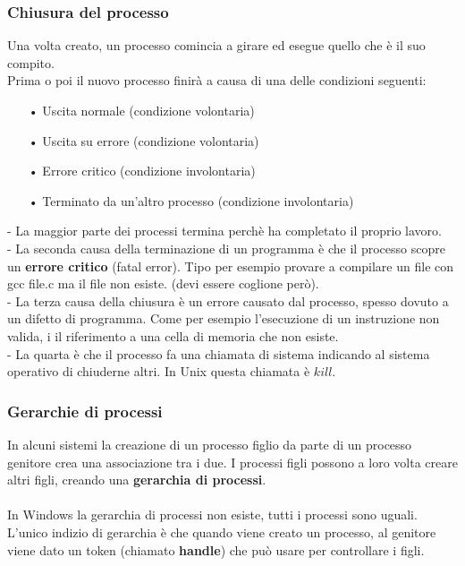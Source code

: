 \documentclass{article}
\begin{document}
\newpage
\subsubsection{Chiusura del processo}
Una volta creato, un processo comincia a girare ed esegue quello che è il suo compito. 
\\Prima o poi il nuovo processo finirà a causa di una delle condizioni seguenti:
\begin{enumerate}
   \item[•] Uscita normale (condizione volontaria)
   \item[•] Uscita su errore (condizione volontaria)
   \item[•] Errore critico (condizione involontaria)
   \item[•] Terminato da un'altro processo (condizione involontaria)
\end{enumerate}
- La maggior parte dei processi termina perchè ha completato il proprio lavoro.
\\
- La seconda causa della terminazione di un programma è che il processo scopre un \textbf{errore critico} (fatal error).
Tipo per esempio provare a compilare un file con gcc file.c ma il file non esiste. (devi essere coglione però).
\\
- La terza causa della chiusura è un errore causato dal processo, spesso dovuto a un difetto di programma. Come per esempio l'esecuzione di un instruzione non valida, i il riferimento a una cella di memoria che non esiste.
\\
- La quarta è che il processo fa una chiamata di sistema indicando al sistema operativo di chiuderne altri. In Unix questa chiamata è $kill$.

\subsubsection{Gerarchie di processi}
In alcuni sistemi la creazione di un processo figlio da parte di un processo genitore crea una associazione tra i due. I processi figli possono 
a loro volta creare altri figli, creando una \textbf{gerarchia di processi}.
\\
\\
In Windows la gerarchia di processi non esiste, tutti i processi sono uguali.\\ L'unico indizio di gerarchia è che quando viene creato un processo, al genitore 
viene dato un token (chiamato \textbf{handle}) che può usare per controllare i figli. 
\end{document}

